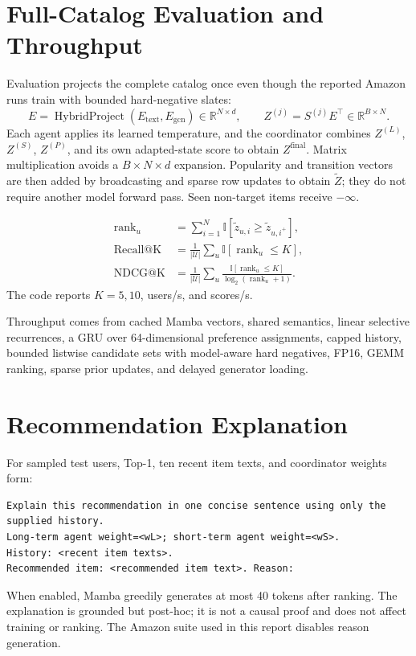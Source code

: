 \documentclass[11pt,a4paper]{article}
\newcommand{\R}{\mathbb{R}}
\begin{document}
\section{Full-Catalog Evaluation and Throughput}

Evaluation projects the complete catalog once even though the reported Amazon
runs train with bounded hard-negative slates:
\begin{equation}
  E=\operatorname{HybridProject}(E_{\mathrm{text}},E_{\mathrm{gcn}})
  \in\R^{N\times d},
  \qquad Z^{(j)}=S^{(j)}E^\top\in\R^{B\times N}.
\end{equation}
Each agent applies its learned temperature, and the coordinator combines
$Z^{(L)}$, $Z^{(S)}$, $Z^{(P)}$, and its own adapted-state score to obtain
$Z^{\mathrm{final}}$. Matrix multiplication avoids a $B\times N\times d$
expansion. Popularity and transition vectors are then added by broadcasting
and sparse row updates to obtain $\widetilde Z$; they do not require another
model forward pass. Seen non-target items receive $-\infty$.

\begin{align}
  \operatorname{rank}_u
  &=\sum_{i=1}^N\mathbb{I}[\widetilde z_{u,i}\geq
    \widetilde z_{u,i^+}],\\
  \operatorname{Recall@K}
  &=\frac1{|\mathcal U|}\sum_u\mathbb{I}[\operatorname{rank}_u\leq K],\\
  \operatorname{NDCG@K}
  &=\frac1{|\mathcal U|}\sum_u
  \frac{\mathbb{I}[\operatorname{rank}_u\leq K]}
       {\log_2(\operatorname{rank}_u+1)}.
\end{align}
The code reports $K=5,10$, users/s, and scores/s.

Throughput comes from cached Mamba vectors, shared semantics, linear
selective recurrences, a GRU over 64-dimensional preference assignments, capped
history, bounded listwise candidate sets with model-aware hard negatives, FP16,
GEMM ranking, sparse prior updates, and delayed generator loading.

\section{Recommendation Explanation}

For sampled test users, Top-1, ten recent item texts, and coordinator weights form:
\begin{lstlisting}[language={}]
Explain this recommendation in one concise sentence using only the supplied history.
Long-term agent weight=<wL>; short-term agent weight=<wS>.
History: <recent item texts>.
Recommended item: <recommended item text>. Reason:
\end{lstlisting}
When enabled, Mamba greedily generates at most 40 tokens after ranking. The explanation is grounded but post-hoc; it is not a causal proof and does not affect training or ranking. The Amazon suite used in this report disables reason generation.
\end{document}
